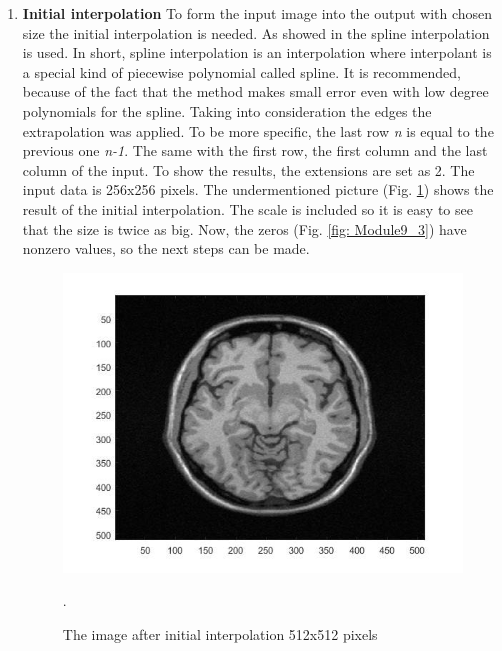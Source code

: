 \begin{enumerate}

\item \textbf{Initial interpolation}
\newline To form the input image into the output with chosen size the initial interpolation is needed. As showed in \cite{9art1} the spline interpolation is used. In short, spline interpolation is an interpolation where interpolant is a special kind of piecewise polynomial called spline. It is recommended, because of the fact that the method makes small error even with low degree polynomials for the spline. Taking into consideration the edges the extrapolation was applied. To be more specific, the last row \textit{n} is equal to the previous one \textit{n-1}. The same with the first row, the first column and the last column of the input. To show the results, the extensions are set as 2. The input data is 256x256 pixels. The undermentioned picture (Fig. \ref{fig: Module10_5}) shows the result of the initial interpolation. The scale is included so it is easy to see that the size is twice as big. Now, the zeros (Fig. \ref{fig: Module9_3}) have  nonzero values, so the next steps can be made.


\begin{figure}[H]
\centering{}\includegraphics[scale=0.5]{figures/Module_10/Module10_5}\caption{The image after initial interpolation 512x512 pixels}. 
\label{fig: Module10_5}
\end{figure}


\end{enumerate}
